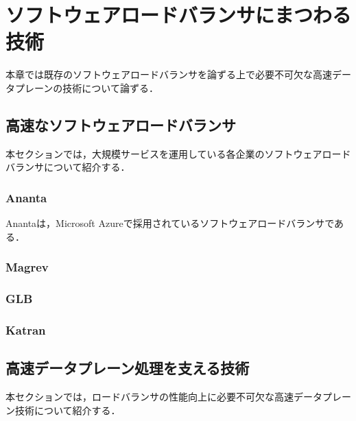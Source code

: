 \chapter{ソフトウェアロードバランサにまつわる技術}
\label{related}
本章では既存のソフトウェアロードバランサを論ずる上で必要不可欠な高速データプレーンの技術について論ずる．






\section{高速なソフトウェアロードバランサ}
\label{related:rapidlb}
本セクションでは，大規模サービスを運用している各企業のソフトウェアロードバランサについて紹介する．
\subsection{Ananta}
Anantaは，Microsoft Azureで採用されているソフトウェアロードバランサである．

\subsection{Magrev}

\subsection{GLB}

\subsection{Katran}


\section{高速データプレーン処理を支える技術}
\label{related:a-dplane}
本セクションでは，ロードバランサの性能向上に必要不可欠な高速データプレーン技術について紹介する．

